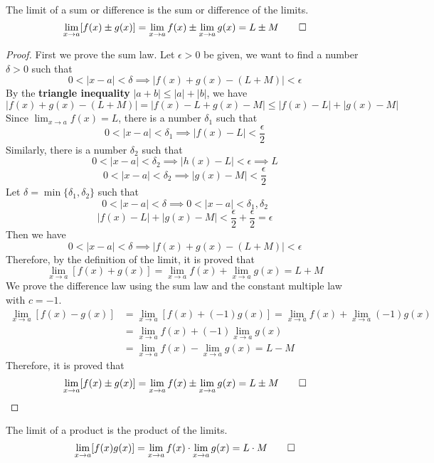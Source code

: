 \begin{theorem}
    The limit of a sum or difference is the sum or difference of the limits.
    \[\lim_{x\to a}[f(x)\pm g(x)]=\lim_{x\to a}f(x)\pm\lim_{x\to a}g(x)
    =L\pm M\qedhere\]
\end{theorem}
\begin{proof}
    First we prove the sum law.
    Let \(\epsilon>0\) be given, we want to find a number \(\delta>0\) such
    that \[0<|x-a|<\delta\implies|f(x)+g(x)-(L+M)|<\epsilon\]
    By the \textbf{triangle inequality} \(|a+b|\leq|a|+|b|\), we have
    \[|f(x)+g(x)-(L+M)|=|f(x)-L+g(x)-M|\leq|f(x)-L|+|g(x)-M|\]
    Since \(\lim_{x\to a}f(x)=L\), there is a number \(\delta_1\) such that
    \[0<|x-a|<\delta_1\implies|f(x)-L|<\frac{\epsilon}{2}\]
    Similarly, there is a number \(\delta_2\) such that
    \[0<|x-a|<\delta_2\implies|h(x)-L|<\epsilon\implies L\]
    \[0<|x-a|<\delta_2\implies|g(x)-M|<\frac{\epsilon}{2}\]
    Let \(\delta=\min\{\delta_1,\delta_2\}\) such that
    \[0<|x-a|<\delta\implies0<|x-a|<\delta_1,\delta_2\]
    \[|f(x)-L|+|g(x)-M|<\frac{\epsilon}{2}+\frac{\epsilon}{2}=\epsilon\]
    Then we have \[0<|x-a|<\delta\implies|f(x)+g(x)-(L+M)|<\epsilon\]
    Therefore, by the definition of the limit, it is proved that
    \[\lim_{x\to a}[f(x)+g(x)]=\lim_{x\to a}f(x)+\lim_{x\to a}g(x)=L+M\]
    We prove the difference law using the sum law and the constant multiple
    law with \(c=-1\).
    \begin{align*}
        \lim_{x\to a}[f(x)-g(x)]&=\lim_{x\to a}[f(x)+(-1)g(x)]
        =\lim_{x\to a}f(x)+\lim_{x\to a}(-1)g(x) \\
        &=\lim_{x\to a}f(x)+(-1)\lim_{x\to a}g(x) \\
        &=\lim_{x\to a}f(x)-\lim_{x\to a}g(x) = L-M
    \end{align*}
    Therefore, it is proved that
    \[\lim_{x\to a}[f(x)\pm g(x)]=\lim_{x\to a}f(x)\pm\lim_{x\to a}g(x)
    =L\pm M\qedhere\]
\end{proof}
\begin{theorem}
    The limit of a product is the product of the limits.
    \[\lim_{x\to a}[f(x)g(x)]=\lim_{x\to a}f(x)\cdot\lim_{x\to a}g(x)
    =L\cdot M\qedhere\]
\end{theorem}
